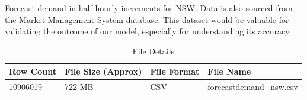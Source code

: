 \documentclass[mstat,12pt]{unswthesis}
\begin{document}
Forecast demand in half-hourly increments for NSW. Data is also sourced
from the Market Management System database. This dataset would be
valuable for validating the outcome of our model, especially for
understanding its accuracy.

\begin{table}[h]
\centering
\caption{File Details}
\tiny
\begin{tabular}{@{}|l|l|l|l|@{}}
\toprule
\textbf{Row Count} & \textbf{File Size (Approx)} & \textbf{File Format} & \textbf{File Name}      \\ \midrule
10906019           & 722 MB                      & CSV                  & forecastdemand\_nsw.csv \\ \bottomrule
\end{tabular}
\end{table}
\end{document}
